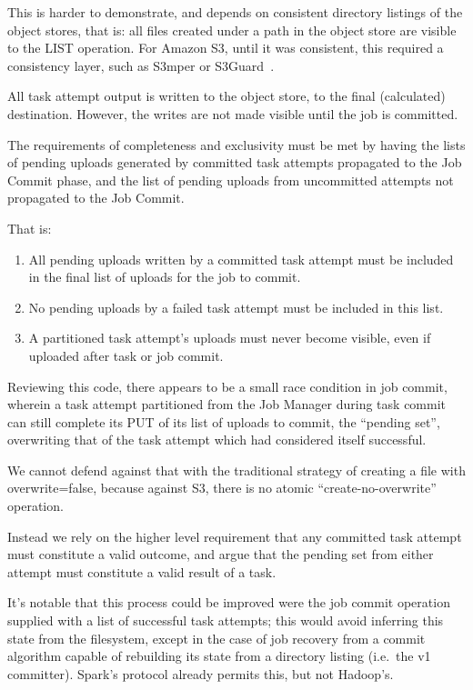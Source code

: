 \documentclass[conference]{IEEEtran}
\begin{document}
This is harder to demonstrate, and depends on consistent directory
listings of the object stores, that is: all files created under a path
in the object store are visible to the LIST operation.
For Amazon S3, until it was consistent, this required a consistency layer,
such as S3mper or S3Guard\ \cite{S3mper,HADOOP-13345}.

All task attempt output is written to the object store, to the final (calculated)
destination.
However, the writes are not made visible until the job is committed.

The requirements of completeness and exclusivity must be met by
having the lists of pending uploads generated by committed task attempts propagated
to the Job Commit phase, and the list of pending uploads from uncommitted
attempts not propagated to the Job Commit.

That is:

\begin{enumerate}
  \item All pending uploads written by a committed task attempt must be
  included in the final list of uploads for the job to commit.
  \item No pending uploads by a failed task attempt must be included in this list.
  \item A partitioned task attempt's uploads must never become visible,
  even if uploaded after task or job commit.
\end{enumerate}


Reviewing this code, there appears to be a small race condition in job commit,
wherein a task attempt partitioned from the Job Manager during task commit
can still complete its PUT of its list of uploads to commit, the ``pending set'',
overwriting that of the task attempt which had considered itself successful.

We cannot defend against that with the traditional strategy of creating
a file with overwrite=false, because against S3, there is no atomic
``create-no-overwrite'' operation.

Instead we rely on the higher level requirement that any committed task attempt must
constitute a valid outcome, and argue that the pending set from either attempt
must constitute a valid result of a task.


It's notable that this process could be improved were the job commit
operation supplied with a list of successful task attempts;
this would avoid inferring this state from the filesystem, except in
the case of job recovery from a commit algorithm capable of
rebuilding its state from a directory listing (i.e.\ the v1 committer).
Spark's protocol already permits this, but not Hadoop's.
\end{document}
